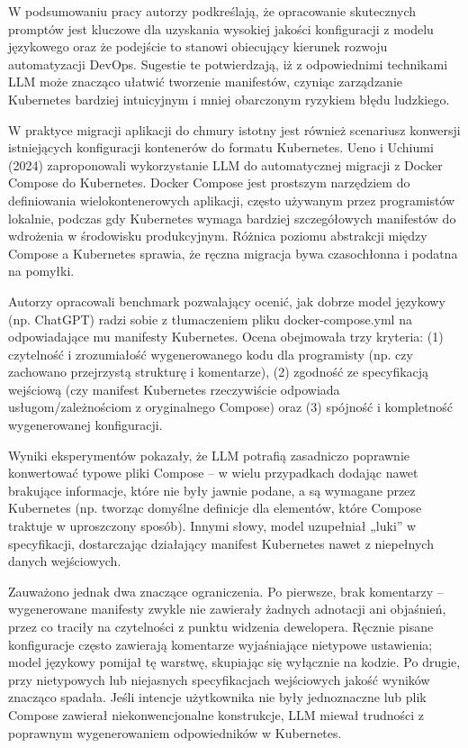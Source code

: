 W podsumowaniu pracy autorzy podkreślają, że opracowanie skutecznych promptów jest kluczowe dla uzyskania wysokiej jakości konfiguracji z modelu językowego oraz że podejście to stanowi obiecujący kierunek rozwoju automatyzacji DevOps. Sugestie te potwierdzają, iż z odpowiednimi technikami LLM może znacząco ułatwić tworzenie manifestów, czyniąc zarządzanie Kubernetes bardziej intuicyjnym i mniej obarczonym ryzykiem błędu ludzkiego.

W praktyce migracji aplikacji do chmury istotny jest również scenariusz konwersji istniejących konfiguracji kontenerów do formatu Kubernetes. Ueno i Uchiumi (2024) \cite{ueno_migrating_2024} zaproponowali wykorzystanie LLM do automatycznej migracji z Docker Compose do Kubernetes. Docker Compose jest prostszym narzędziem do definiowania wielokontenerowych aplikacji, często używanym przez programistów lokalnie, podczas gdy Kubernetes wymaga bardziej szczegółowych manifestów do wdrożenia w środowisku produkcyjnym. Różnica poziomu abstrakcji między Compose a Kubernetes sprawia, że ręczna migracja bywa czasochłonna i podatna na pomyłki.

Autorzy opracowali benchmark pozwalający ocenić, jak dobrze model językowy (np. ChatGPT) radzi sobie z tłumaczeniem pliku docker-compose.yml na odpowiadające mu manifesty Kubernetes. Ocena obejmowała trzy kryteria: (1) czytelność i zrozumiałość wygenerowanego kodu dla programisty (np. czy zachowano przejrzystą strukturę i komentarze), (2) zgodność ze specyfikacją wejściową (czy manifest Kubernetes rzeczywiście odpowiada usługom/zależnościom z oryginalnego Compose) oraz (3) spójność i kompletność wygenerowanej konfiguracji.

Wyniki eksperymentów pokazały, że LLM potrafią zasadniczo poprawnie konwertować typowe pliki Compose – w wielu przypadkach dodając nawet brakujące informacje, które nie były jawnie podane, a są wymagane przez Kubernetes (np. tworząc domyślne definicje dla elementów, które Compose traktuje w uproszczony sposób). Innymi słowy, model uzupełniał „luki” w specyfikacji, dostarczając działający manifest Kubernetes nawet z niepełnych danych wejściowych.

Zauważono jednak dwa znaczące ograniczenia. Po pierwsze, brak komentarzy – wygenerowane manifesty zwykle nie zawierały żadnych adnotacji ani objaśnień, przez co traciły na czytelności z punktu widzenia dewelopera. Ręcznie pisane konfiguracje często zawierają komentarze wyjaśniające nietypowe ustawienia; model językowy pomijał tę warstwę, skupiając się wyłącznie na kodzie. Po drugie, przy nietypowych lub niejasnych specyfikacjach wejściowych jakość wyników znacząco spadała. Jeśli intencje użytkownika nie były jednoznaczne lub plik Compose zawierał niekonwencjonalne konstrukcje, LLM miewał trudności z poprawnym wygenerowaniem odpowiedników w Kubernetes.

